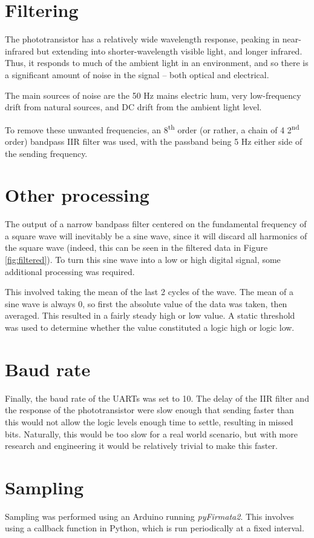 \documentclass{article}
\begin{document}
\begin{multicols}{2}
\section{Filtering}
The phototransistor has a relatively wide wavelength response, peaking in near-infrared but extending into shorter-wavelength visible light, and longer infrared. Thus, it responds to much of the ambient light in an environment, and so there is a significant amount of noise in the signal -- both optical and electrical.

The main sources of noise are the 50 Hz mains electric hum, very low-frequency drift from natural sources, and DC drift from the ambient light level. 

To remove these unwanted frequencies, an 8\textsuperscript{th} order (or rather, a chain of 4 2\textsuperscript{nd} order) bandpass IIR filter was used, with the passband being 5 Hz either side of the sending frequency. 

\section{Other processing}
The output of a narrow bandpass filter centered on the fundamental frequency of a square wave will inevitably be a sine wave, since it will discard all harmonics of the square wave (indeed, this can be seen in the filtered data in Figure \ref{fig:filtered}). To turn this sine wave into a low or high digital signal, some additional processing was required. 

This involved taking the mean of the last 2 cycles of the wave. The mean of a sine wave is always 0, so first the absolute value of the data was taken, then averaged. This resulted in a fairly steady high or low value. A static threshold was used to determine whether the value constituted a logic high or logic low.

\section{Baud rate}
Finally, the baud rate of the UARTs was set to 10. The delay of the IIR filter and the response of the phototransistor were slow enough that sending faster than this would not allow the logic levels enough time to settle, resulting in missed bits. Naturally, this would be too slow for a real world scenario, but with more research and engineering it would be relatively trivial to make this faster. 

\section{Sampling}
Sampling was performed using an Arduino running \textit{pyFirmata2}. This involves using a callback function in Python, which is run periodically at a fixed interval. 


\end{multicols}
\end{document}
